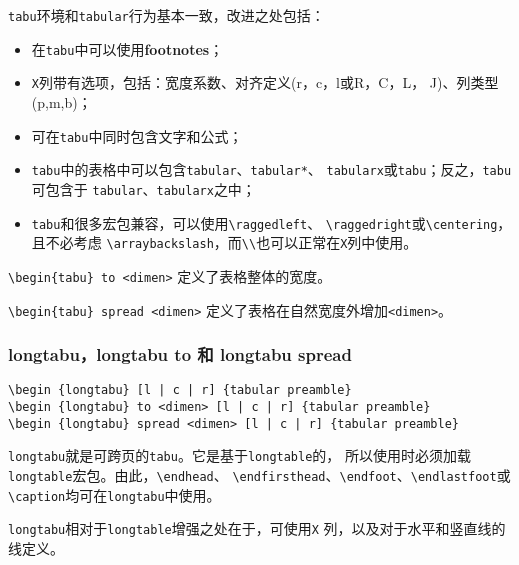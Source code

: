 \documentclass{article}
\begin{document}
\texttt{tabu}环境和\texttt{tabular}行为基本一致，改进之处包括：
\begin{itemize}
\item 在\texttt{tabu}中可以使用\textbf{footnotes}；
\item \texttt{X}列带有选项，包括：宽度系数、对齐定义(r，c，l或R，C，L，
  J)、列类型(p,m,b)；
\item 可在\texttt{tabu}中同时包含文字和公式；
\item \texttt{tabu}中的表格中可以包含\texttt{tabular}、\texttt{tabular*}、
  \texttt{tabularx}或\texttt{tabu}；反之，\texttt{tabu}可包含于
  \texttt{tabular}、\texttt{tabularx}之中；
\item \texttt{tabu}和很多宏包兼容，可以使用\verb!\raggedleft!、
  \verb!\raggedright!或\verb!\centering!，且不必考虑
  \verb!\arraybackslash!，而\verb!\\!也可以正常在\texttt{X}列中使用。
\end{itemize}

\verb!\begin{tabu} to <dimen>! 定义了表格整体的宽度。

\verb!\begin{tabu} spread <dimen>! 定义了表格在自然宽度外增加\verb!<dimen>!。

\subsubsection{longtabu，longtabu to 和 longtabu spread}
\begin{verbatim}
\begin {longtabu} [l | c | r] {tabular preamble}
\begin {longtabu} to <dimen> [l | c | r] {tabular preamble}
\begin {longtabu} spread <dimen> [l | c | r] {tabular preamble}
\end{verbatim}

\texttt{longtabu}就是可跨页的\texttt{tabu}。它是基于\texttt{longtable}的，
所以使用时必须加载\texttt{longtable}宏包。由此，\verb!\endhead!、
\verb!\endfirsthead!、\verb!\endfoot!、\verb!\endlastfoot!或
\verb!\caption!均可在\texttt{longtabu}中使用。

\texttt{longtabu}相对于\texttt{longtable}增强之处在于，可使用\texttt{X}
列，以及对于水平和竖直线的线定义。

\end{document}
